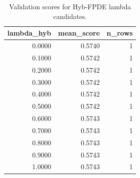 \begin{table}[t]
\caption{Validation scores for Hyb-FPDE lambda candidates.}
\label{tab:lambda_distribution_computed}
\centering
\begin{tabular}{rrr}
\toprule
lambda\_hyb & mean\_score & n\_rows \\
\midrule
0.0000 & 0.5740 & 1 \\
0.1000 & 0.5742 & 1 \\
0.2000 & 0.5742 & 1 \\
0.3000 & 0.5742 & 1 \\
0.4000 & 0.5742 & 1 \\
0.5000 & 0.5742 & 1 \\
0.6000 & 0.5743 & 1 \\
0.7000 & 0.5743 & 1 \\
0.8000 & 0.5743 & 1 \\
0.9000 & 0.5743 & 1 \\
1.0000 & 0.5743 & 1 \\
\bottomrule
\end{tabular}

\end{table}
